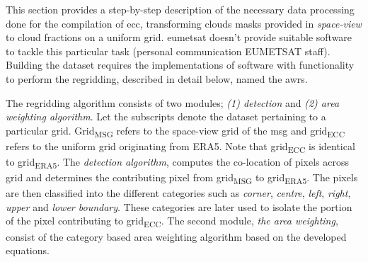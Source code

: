 This section provides a step-by-step description of the necessary data processing done for the compilation of \acrshort{ecc}, transforming clouds masks provided in \textit{space-view} to cloud fractions on a uniform grid. \acrshort{eumetsat} doesn't provide suitable software to tackle this particular task (personal communication EUMETSAT staff). Building the dataset requires the implementations of software with functionality to perform the regridding, described in detail below, named the \acrfull{awrs}.

The regridding algorithm consists of two modules; \textit{(1) detection} and \textit{(2) area weighting algorithm}. Let the subscripts denote the dataset pertaining to a particular grid. Grid\textsubscript{MSG} refers to the space-view grid of the \acrlong{msg} and grid\textsubscript{ECC} refers to the uniform grid originating from ERA5. Note that grid\textsubscript{ECC} is identical to  grid\textsubscript{ERA5}. The \textit{detection algorithm}, computes the co-location of pixels across grid and determines the contributing pixel from grid\textsubscript{MSG} to grid\textsubscript{ERA5}.
%
The pixels are then classified into the different categories such as \textit{corner}, \textit{centre}, \textit{left}, \textit{right}, \textit{upper} and \textit{lower boundary}. These categories are later used to isolate the portion of the pixel contributing to grid\textsubscript{ECC}.
The second module, \textit{the area weighting}, consist of the category based area weighting algorithm based on the developed equations.

